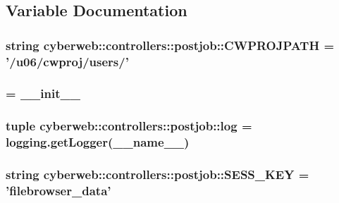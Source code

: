 \subsection{\-Variable \-Documentation}
\hypertarget{namespacecyberweb_1_1controllers_1_1postjob_a1ec6befe6b35c4526dce073d7c1d3657}{
\subsubsection[{\-C\-W\-P\-R\-O\-J\-P\-A\-T\-H}]{\setlength{\rightskip}{0pt plus 5cm}string {\bf cyberweb\-::controllers\-::postjob\-::\-C\-W\-P\-R\-O\-J\-P\-A\-T\-H} = '/u06/cwproj/users/'}}\label{namespacecyberweb_1_1controllers_1_1postjob_a1ec6befe6b35c4526dce073d7c1d3657}
\hypertarget{namespacecyberweb_1_1controllers_1_1postjob_a38c4eb21829d1c14ab95ed4bbd39afd3}{
\subsubsection[{\-Gnuplot}]{ = \-\_\-\-\_\-init\-\_\-\-\_\-}}\label{namespacecyberweb_1_1controllers_1_1postjob_a38c4eb21829d1c14ab95ed4bbd39afd3}
\hypertarget{namespacecyberweb_1_1controllers_1_1postjob_a55a4037458c229aed4f7760fbbd863c4}{
\subsubsection[{log}]{\setlength{\rightskip}{0pt plus 5cm}tuple {\bf cyberweb\-::controllers\-::postjob\-::log} = logging.\-get\-Logger(\-\_\-\-\_\-name\-\_\-\-\_\-)}}\label{namespacecyberweb_1_1controllers_1_1postjob_a55a4037458c229aed4f7760fbbd863c4}
\hypertarget{namespacecyberweb_1_1controllers_1_1postjob_a8469d799a7937a01481f21c451829f8d}{
\subsubsection[{\-S\-E\-S\-S\-\_\-\-K\-E\-Y}]{\setlength{\rightskip}{0pt plus 5cm}string {\bf cyberweb\-::controllers\-::postjob\-::\-S\-E\-S\-S\-\_\-\-K\-E\-Y} = 'filebrowser\-\_\-data'}}\label{namespacecyberweb_1_1controllers_1_1postjob_a8469d799a7937a01481f21c451829f8d}
